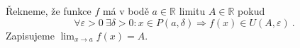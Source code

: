 \begin{definition}
	Řekneme, že funkce $f$ má v bodě $a \in \mathbb{R}$ limitu $A \in \mathbb{R}$ pokud 
	$$\forall \varepsilon>0 \ \exists \delta>0 \colon x \in P(a, \delta) \Rightarrow  f(x) \in U(A, \varepsilon) \ .$$
	Zapisujeme $\lim_{x \rightarrow a} f(x) = A$.
	\label{def:limita_funkce}
\end{definition}

